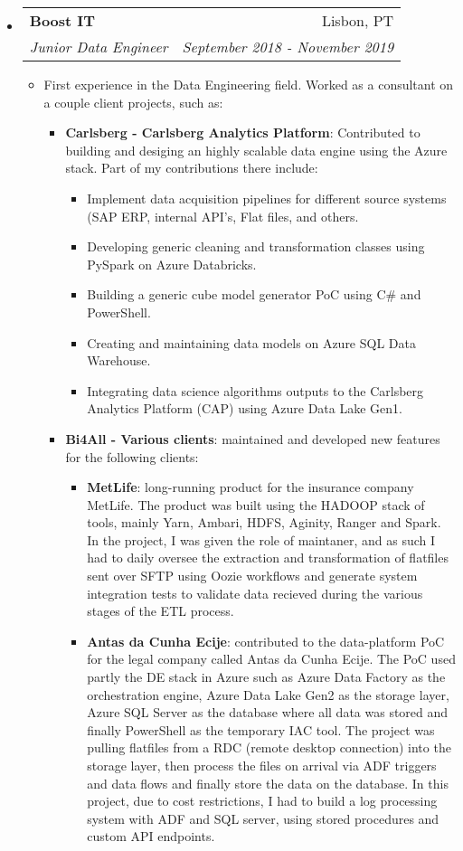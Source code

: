\documentclass[letterpaper,11pt]{article} \newlength{\outerbordwidth} \pagestyle{empty}
\makeatletter
\newcommand{\resitem}[1]{\item #1 \vspace{-2pt}}
\newcommand{\ressubheading}[4]{
\begin{tabular*}{6.5in}{l@{\cftdotfill{\cftsecdotsep}\extracolsep{\fill}}r}
		\textbf{#1} & #2 \\
		\textit{#3} & \textit{#4} \\
\end{tabular*}\vspace{-6pt}}
\makeatother
\begin{document}
\begin{itemize}
\item
    \ressubheading{Boost IT}{Lisbon, PT}{Junior Data Engineer}{September 2018 - November 2019}
	\begin{itemize}
      \resitem{First experience in the Data Engineering field. Worked as a consultant on a couple client projects, such as:}
        \begin{itemize}
                \resitem{\textbf{Carlsberg - Carlsberg Analytics Platform}: Contributed to building and desiging an highly scalable data engine using the Azure stack. Part of my contributions there include:} 
                    \begin{itemize}
                            \resitem{Implement data acquisition pipelines for different source systems (SAP ERP, internal API's, Flat files, and others.}
                            \resitem{Developing generic cleaning and transformation classes using PySpark on Azure Databricks.}
                            \resitem{Building a generic cube model generator PoC using C\# and PowerShell.}
                            \resitem{Creating and maintaining data models on Azure SQL Data Warehouse.}
                            \resitem{Integrating data science algorithms outputs to the Carlsberg Analytics Platform (CAP) using Azure Data Lake Gen1.}
                    \end{itemize}
                \resitem{\textbf{Bi4All - Various clients}: maintained and developed new features for the following clients:}
                    \begin{itemize}
                            \resitem{\textbf{MetLife}: long-running product for the insurance company MetLife. The product was built using the HADOOP stack of tools, mainly Yarn, Ambari, HDFS, Aginity, Ranger and Spark. In the project, I was given the role of maintaner, and as such I had to daily oversee the extraction and transformation of flatfiles sent over SFTP using Oozie workflows and generate system integration tests to validate data recieved during the various stages of the ETL process.}
                            \resitem{\textbf{Antas da Cunha Ecije}: contributed to the data-platform PoC for the legal company called Antas da Cunha Ecije. The PoC used partly the DE stack in Azure such as Azure Data Factory as the orchestration engine, Azure Data Lake Gen2 as the storage layer, Azure SQL Server as the database where all data was stored and finally PowerShell as the temporary IAC tool. The project was pulling flatfiles from a RDC (remote desktop connection) into the storage layer, then process the files on arrival via ADF triggers and data flows and finally store the data on the database. In this project, due to cost restrictions, I had to build a log processing system with ADF and SQL server, using stored procedures and custom API endpoints.}
                    \end{itemize}
        \end{itemize}
	\end{itemize}

\end{itemize}
\end{document}
